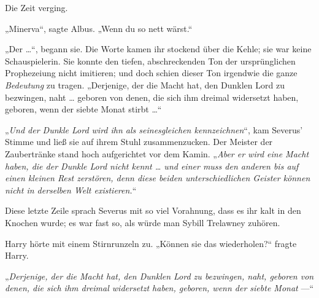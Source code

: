 Die Zeit verging.

„Minerva“, sagte Albus.
„Wenn du so nett wärst.“

„Der …“, begann sie. Die Worte kamen ihr stockend über die Kehle; sie war keine Schauspielerin. Sie konnte den tiefen, abschreckenden Ton der ursprünglichen Prophezeiung nicht imitieren; und doch schien dieser Ton irgendwie die ganze \emph{Bedeutung} zu tragen.
„Derjenige, der die Macht hat, den Dunklen Lord zu bezwingen, naht … geboren von denen, die sich ihm dreimal widersetzt haben, geboren, wenn der siebte Monat stirbt …“

„\emph{Und der Dunkle Lord wird ihn als seinesgleichen kennzeichnen}“, kam Severus’ Stimme und ließ sie auf ihrem Stuhl zusammenzucken. Der Meister der Zaubertränke stand hoch aufgerichtet vor dem Kamin.
„\emph{Aber er wird eine Macht haben, die der Dunkle Lord nicht kennt … und einer muss den anderen bis auf einen kleinen Rest zerstören, denn diese beiden unterschiedlichen Geister können nicht in derselben Welt existieren.}“

Diese letzte Zeile sprach Severus mit so viel Vorahnung, dass es ihr kalt in den Knochen wurde; es war fast so, als würde man Sybill Trelawney zuhören.

Harry hörte mit einem Stirnrunzeln zu.
„Können sie das wiederholen?“ fragte Harry.

„\emph{Derjenige, der die Macht hat, den Dunklen Lord zu bezwingen, naht, geboren von denen, die sich ihm dreimal widersetzt haben, geboren, wenn der siebte Monat} —“

